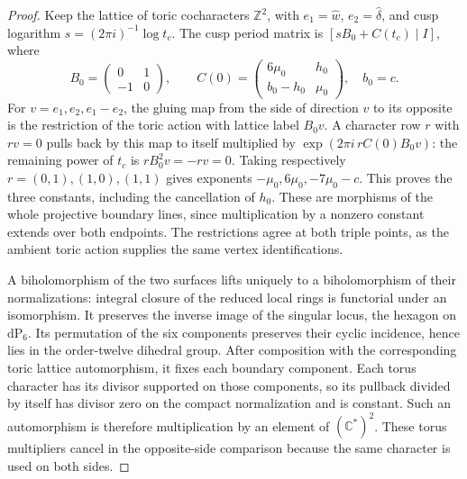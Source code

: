\begin{proof}
Keep the lattice of toric cocharacters \(\mathbb Z^2\), with
\(e_1=\widehat w\), \(e_2=\widehat\delta\), and cusp logarithm
\(s=(2\pi i)^{-1}\log t_c\). The cusp period matrix is
\([sB_0+C(t_c)\mid I]\), where
\[
 B_0=\begin{pmatrix}0&1\\-1&0\end{pmatrix},\qquad
 C(0)=\begin{pmatrix}6\mu_0&h_0\\b_0-h_0&\mu_0\end{pmatrix},
 \quad b_0=c.
\]
For \(v=e_1,e_2,e_1-e_2\), the gluing map from the side of direction
\(v\) to its opposite is the restriction of the toric action with lattice
label \(B_0v\). A character row \(r\) with \(rv=0\) pulls back by this
map to itself multiplied by
\(\exp(2\pi i\,rC(0)B_0v)\): the remaining power of \(t_c\) is
\(rB_0^2v=-rv=0\). Taking respectively
\(r=(0,1),(1,0),(1,1)\) gives exponents
\(-\mu_0,6\mu_0,-7\mu_0-c\). This proves the three constants, including
the cancellation of \(h_0\). These are morphisms of the whole projective
boundary lines, since multiplication by a nonzero constant extends over
both endpoints. The restrictions agree at both triple points, as the
ambient toric action supplies the same vertex identifications.

A biholomorphism of the two surfaces lifts uniquely to a biholomorphism
of their normalizations: integral closure of the reduced local rings is
functorial under an isomorphism. It preserves the inverse image of the
singular locus, the hexagon on \(\mathrm{dP}_6\). Its permutation of the
six components preserves their cyclic incidence, hence lies in the
order-twelve dihedral group. After composition with the corresponding
toric lattice automorphism, it fixes each boundary component. Each torus
character has its divisor supported on those components, so its pullback
divided by itself has divisor zero on the compact normalization and is
constant. Such an automorphism is therefore multiplication by an element
of \((\mathbb C^*)^2\). These torus multipliers cancel in the opposite-side
comparison because the same character is used on both sides.


\end{proof}
